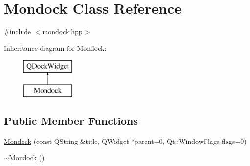 \hypertarget{class_mondock}{\section{Mondock Class Reference}
\label{class_mondock}
}


{\ttfamily \#include $<$mondock.\+hpp$>$}

Inheritance diagram for Mondock\+:\begin{figure}[H]
\begin{center}
\leavevmode
\includegraphics[height=2.000000cm]{class_mondock}
\end{center}
\end{figure}
\subsection*{Public Member Functions}
\begin{DoxyCompactItemize}
\item 
\hyperlink{class_mondock_a31297333af7c87f4f9773728db845d7f}{Mondock} (const Q\+String \&title, Q\+Widget $\ast$parent=0, Qt\+::\+Window\+Flags flags=0)
\item 
\hyperlink{class_mondock_a33aa83a1e0de9cf10380c1a5237eec7e}{$\sim$\+Mondock} ()
\end{DoxyCompactItemize}
